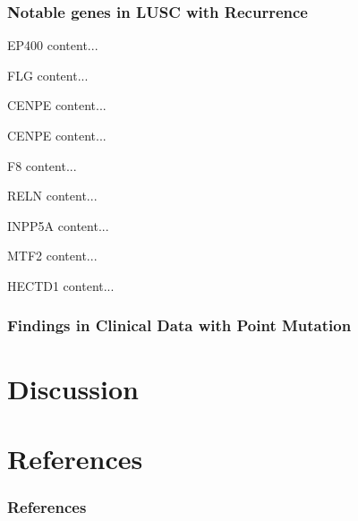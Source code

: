 \documentclass{beamer}
\begin{document}
    \begin{frame}[allowframebreaks]
        \frametitle{Notable genes in LUSC with Recurrence}

        \begin{block}{EP400}
            content...
        \end{block}

        \begin{block}{FLG}
            content...
        \end{block}

        \begin{block}{CENPE}
            content...
        \end{block}

        \begin{block}{CENPE}
            content...
        \end{block}

        \begin{block}{F8}
            content...
        \end{block}

        \begin{block}{RELN}
            content...
        \end{block}

        \begin{block}{INPP5A}
            content...
        \end{block}

        \begin{block}{MTF2}
            content...
        \end{block}

        \begin{block}{HECTD1}
            content...
        \end{block}
    \end{frame}

    \begin{frame}
        \frametitle{Findings in Clinical Data with Point Mutation}
    \end{frame}

    \section{Discussion}

    \section{References}
    \begin{frame}[allowframebreaks]
        \frametitle{References}
        
        
    \end{frame}
\end{document}
